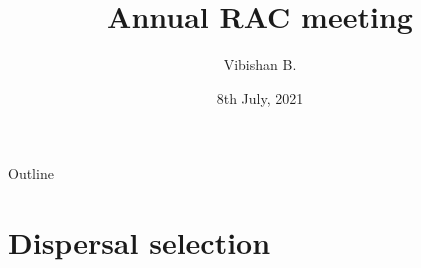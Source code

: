 \documentclass{beamer}
\title{Annual RAC meeting}
\author{Vibishan B.} %
\institute{20163448}
\date[8 Jul]{8th July, 2021}
\begin{document}
	\begin{frame}
		\titlepage
	\end{frame}

\begin{frame}{Outline}
	\tableofcontents
\end{frame}




\section{Dispersal selection}
\end{document}
